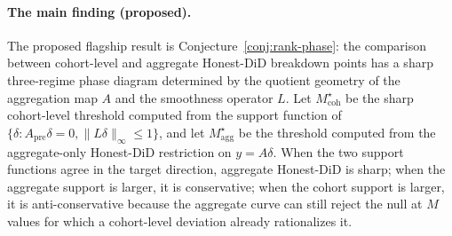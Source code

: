 \documentclass[11pt]{article}
\theoremstyle{definition}
\theoremstyle{plain}
\theoremstyle{remark}
\begin{document}
\paragraph{The main finding (proposed).}
The proposed flagship result is Conjecture~\ref{conj:rank-phase}: the comparison between cohort-level and aggregate Honest-DiD breakdown points has a sharp three-regime phase diagram determined by the quotient geometry of the aggregation map \(A\) and the smoothness operator \(L\).
Let \(M_{\mathrm{coh}}^\star\) be the sharp cohort-level threshold computed from the support function of \(\{\delta:A_{\mathrm{pre}}\delta=0,\|L\delta\|_\infty\le1\}\), and let \(M_{\mathrm{agg}}^\star\) be the threshold computed from the aggregate-only Honest-DiD restriction on \(y=A\delta\).
When the two support functions agree in the target direction, aggregate Honest-DiD is sharp; when the aggregate support is larger, it is conservative; when the cohort support is larger, it is anti-conservative because the aggregate curve can still reject the null at \(M\) values for which a cohort-level deviation already rationalizes it.
\end{document}
